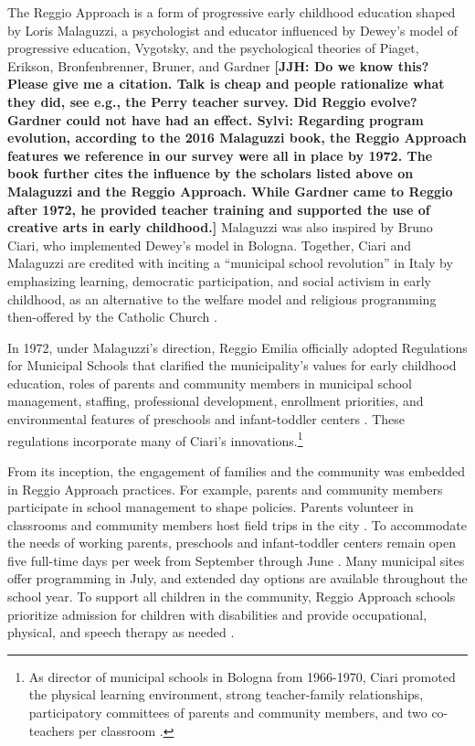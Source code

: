 The Reggio Approach is a form of progressive early childhood education shaped by Loris Malaguzzi, a psychologist and educator influenced by Dewey's model of progressive education, Vygotsky, and the psychological theories of Piaget, Erikson, Bronfenbrenner, Bruner, and Gardner \citep{Rinaldi_2006_ReggioEmilia_BOOK,Cagliari-etal-eds_2016_BOOK_Loris-Malaguzzi} \textbf{[JJH: Do we know this? Please give me a citation. Talk is cheap and people rationalize what they did, see e.g., the Perry teacher survey. Did Reggio evolve? Gardner could not have had an effect. Sylvi: Regarding program evolution, according to the 2016 Malaguzzi book, the Reggio Approach features we reference in our survey were all in place by 1972. The book further cites the influence by the scholars listed above on Malaguzzi and the Reggio Approach. While Gardner came to Reggio after 1972, he provided teacher training and supported the use of creative arts in early childhood.]} Malaguzzi was also inspired by Bruno Ciari, who implemented Dewey's model in Bologna. Together, Ciari and Malaguzzi are credited with inciting a ``municipal school revolution'' in Italy by emphasizing learning, democratic participation, and social activism in early childhood, as an alternative to the welfare model and religious programming then-offered by the Catholic Church \citep{Lazzari_2012_Euro-J-Edu,Cagliari-etal-eds_2016_BOOK_Loris-Malaguzzi}.

In 1972, under Malaguzzi's direction, Reggio Emilia officially adopted Regulations for Municipal Schools that clarified the municipality's values for early childhood education, roles of parents and community members in municipal school management, staffing, professional development, enrollment priorities, and environmental features of preschools and infant-toddler centers \citep{Giaroni_1972_Regulations-Municipal-EC-Schools}. These regulations incorporate many of Ciari's innovations.\footnote{As director of municipal schools in Bologna from 1966-1970, Ciari promoted the physical learning environment, strong teacher-family relationships, participatory committees of parents and community members, and two co-teachers per classroom \citep{Edwards-etal-eds_1998_Hundred-Languages}.} 

From its inception, the engagement of families and the community was embedded in Reggio Approach practices. For example, parents and community members participate in school management to shape policies. Parents volunteer in classrooms and community members host field trips in the city \citep{CEHD_2016_Historical-Analysis,Cagliari-etal-eds_2016_BOOK_Loris-Malaguzzi}. To accommodate the needs of working parents, preschools and infant-toddler centers remain open five full-time days per week from September through June \citep{Giudici-Nicolosi_2014_Reggio-Approach}. Many municipal sites offer programming in July, and extended day options are available throughout the school year. To support all children in the community, Reggio Approach schools prioritize admission for children with disabilities and provide occupational, physical, and speech therapy as needed \citep{Edwards-etal-eds_1998_Hundred-Languages,Giaroni_1972_Regulations-Municipal-EC-Schools}.

